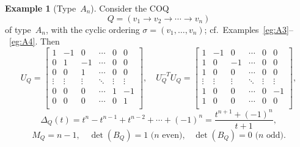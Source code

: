 \documentclass[11pt, letterpaper]{amsart}
\theoremstyle{definition}
\newtheorem{example}[theorem]{Example}
\numberwithin{equation}{section}
\begin{document}
\begin{example}[Type~$A_n$]
\label{eg:An-Alexander}
Consider the COQ 
\begin{equation*}
Q=(v_1\rightarrow v_2\rightarrow\cdots\rightarrow v_n)
\end{equation*}
of type~$A_n$, with the cyclic ordering $\sigma=(v_1,\dots,v_n)$; 
cf.\ Examples~\ref{eg:A3}--~\ref{eg:A4}.
Then
\begin{equation*}
U_Q= \begin{bmatrix} 
1 & -1 & 0 & \cdots & 0 & 0 \\ 
0 &  1 & -1 & \cdots & 0 & 0 \\ 
0 &  0 & 1  & \cdots & 0 & 0 \\
\vdots & \vdots & \vdots & \ddots & \vdots & \vdots \\
0 &  0 & 0  & \cdots & 1 & -1 \\
0 &  0 & 0  & \cdots & 0 & 1 \\
\end{bmatrix}\!, 
\quad
U_Q^{-T}U_Q= \begin{bmatrix} 
1 & -1 & 0 & \cdots & 0 & 0 \\ 
1 &  0 & -1 & \cdots & 0 & 0 \\ 
1 &  0 & 0  & \cdots & 0 & 0 \\
\vdots & \vdots & \vdots & \ddots & \vdots & \vdots \\
1 &  0 & 0  & \cdots & 0 & -1 \\
1 &  0 & 0  & \cdots & 0 & 0 \\
\end{bmatrix}\!, 
\end{equation*}
\begin{equation*}
\Delta_Q(t)=t^n-t^{n-1}+t^{n-2}+\cdots+(-1)^n = \frac{t^{n+1}+(-1)^n}{t+1}, 
\end{equation*}
\begin{equation*}
\label{eq:}
M_Q=n-1, \quad 
\det(B_Q)=1 \text{ ($n$ even),}  \quad  \det(B_Q)=0 \text{ ($n$ odd).} %
\end{equation*}
\end{example}
\end{document}
